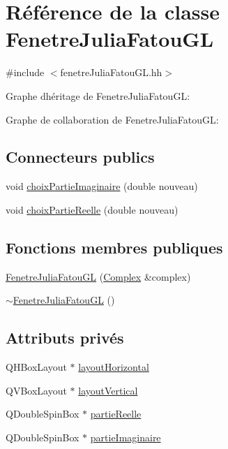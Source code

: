 \hypertarget{classFenetreJuliaFatouGL}{}\section{Référence de la classe Fenetre\+Julia\+Fatou\+GL}
\label{classFenetreJuliaFatouGL}


{\ttfamily \#include $<$fenetre\+Julia\+Fatou\+G\+L.\+hh$>$}



Graphe d\textquotesingle{}héritage de Fenetre\+Julia\+Fatou\+GL\+:


Graphe de collaboration de Fenetre\+Julia\+Fatou\+GL\+:
\subsection*{Connecteurs publics}
\begin{DoxyCompactItemize}
\item 
void \hyperlink{classFenetreJuliaFatouGL_a73ccd24872ccdf2d9d6a982c0ed44d70}{choix\+Partie\+Imaginaire} (double nouveau)
\item 
void \hyperlink{classFenetreJuliaFatouGL_ab7e8e57782d953b9ff196d229f543bec}{choix\+Partie\+Reelle} (double nouveau)
\end{DoxyCompactItemize}
\subsection*{Fonctions membres publiques}
\begin{DoxyCompactItemize}
\item 
\hyperlink{classFenetreJuliaFatouGL_a81cadd784a4ce06c47e7e4223f3c55d5}{Fenetre\+Julia\+Fatou\+GL} (\hyperlink{classComplex}{Complex} \&complex)
\item 
\hyperlink{classFenetreJuliaFatouGL_a2d321f007990c90f48e87d6fb1dc7eda}{$\sim$\+Fenetre\+Julia\+Fatou\+GL} ()
\end{DoxyCompactItemize}
\subsection*{Attributs privés}
\begin{DoxyCompactItemize}
\item 
Q\+H\+Box\+Layout $\ast$ \hyperlink{classFenetreJuliaFatouGL_a212766ae261ef36ff46b50db4e1bff00}{layout\+Horizontal}
\item 
Q\+V\+Box\+Layout $\ast$ \hyperlink{classFenetreJuliaFatouGL_acb452cf6be9c8e45f424df19bba9fa8c}{layout\+Vertical}
\item 
Q\+Double\+Spin\+Box $\ast$ \hyperlink{classFenetreJuliaFatouGL_aa2c66f22aeaf44b6deae63a53e21ab62}{partie\+Reelle}
\item 
Q\+Double\+Spin\+Box $\ast$ \hyperlink{classFenetreJuliaFatouGL_abfa274551dbda5d8d0d37cf04314c007}{partie\+Imaginaire}
\end{DoxyCompactItemize}
